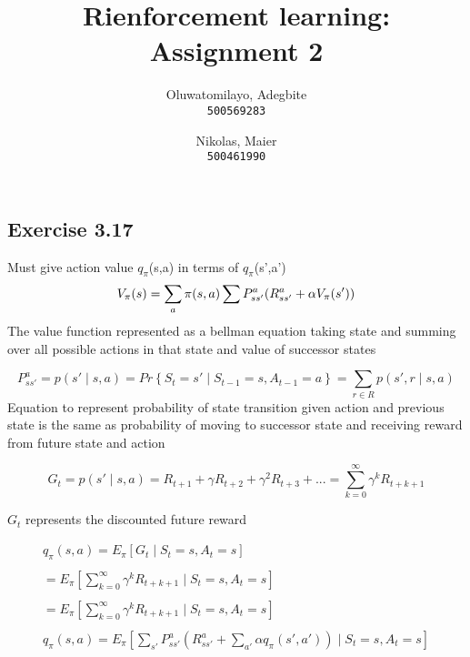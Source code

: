 \documentclass[12pt]{extarticle}
\title{Rienforcement learning: Assignment 2}
\author{
  Oluwatomilayo, Adegbite\\
  \texttt{500569283}
  \and
  Nikolas, Maier\\
  \texttt{500461990}
}
\newcommand{\<}{\langle}
\renewcommand{\>}{\rangle}
\theoremstyle{definition}
\begin{document}
\maketitle

\section{}
\subsection{Exercise 3.17}
Must give action value $q_\pi$(s,a)  in terms of $q_\pi$(s',a') \\ 
 \begin{equation}
V_\pi(s) =  \sum_a \pi(s,a)  \sum P_{s s'}^ a (R_{s s'}^ a +  \alpha V_\pi(s')) \\ \\
\end{equation} 
The value function represented as a bellman equation taking state and summing over all possible actions in that state and value of successor states 

 \begin{equation}
 P_{s s'}^ a = p(s'  \mid s,a) = Pr\left\{ S_t = s' \mid S_{t-1} = s, A_{t-1} = a \right\} = \sum_{r \in R} p(s', r \mid s,a) 
\end{equation} 
Equation to represent probability of state transition given action and previous state is the same as probability of moving to successor state and receiving reward from future state and action

 \begin{equation}
G_t = p(s'  \mid s,a) = R_{t+1} + \gamma R_{t+2} + \gamma^2 R_{t+3}  + ...  = \sum_{k=0}^{ \infty} \gamma^k R_{t+k+1} 
\end{equation} 

$G_t$ represents the discounted future reward 

 \begin{equation}
\begin{split}
q_\pi(s,a)  =  E_\pi [ G_t  \mid S_t = s , A_t = s   ]  \\  \\
  =  E_\pi [  \sum_{k=0}^{ \infty} \gamma^k R_{t+k+1}  \mid S_t = s , A_t = s   ]  \\ \\
  =  E_\pi [  \sum_{k=0}^{ \infty} \gamma^k R_{t+k+1}  \mid S_t = s , A_t = s   ]  \\ \\
q_\pi(s,a) = E_\pi [  \sum_{s'}P_{s s'}^ a (R_{s s'}^ a +  \sum_{a'} \alpha  q_\pi(s',a'))   \mid S_t = s , A_t = s   ]
\end{split}
\end{equation} 
\end{document}
